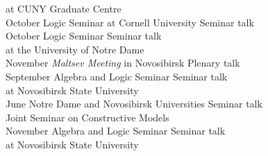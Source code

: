 \documentclass[12pt]{article}
\begin{document}
\begin{tabbing}
                   \>                 \> at CUNY Graduate Centre\\
October              \> Logic Seminar at Cornell University                                      \> Seminar talk\\
October              \> Logic Seminar                                                                      \> Seminar talk\\
                 \>                  \> at the University of Notre Dame\\
November          \> {\em Maltsev Meeting} in Novosibirsk                                             \> Plenary talk\\
September         \> Algebra and Logic Seminar                                                    \> Seminar talk\\
        \>                          \> at Novosibirsk State University\\
June                   \> Notre Dame and Novosibirsk Universities                              \> Seminar talk\\
           \>                        \> Joint Seminar on Constructive Models\\
November          \> Algebra and Logic Seminar                                                    \> Seminar talk\\
                   \>                \> at Novosibirsk State University\\
\end{tabbing}
\end{document}
